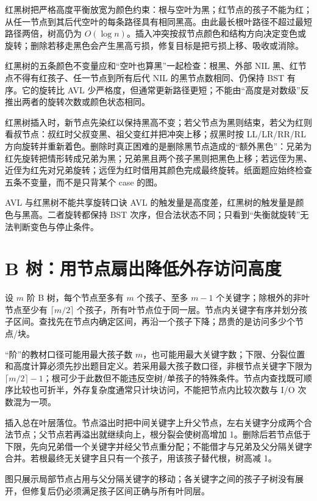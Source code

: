 \documentclass[UTF8,fontset=none,11pt,a4paper]{ctexart}
\begin{document}
红黑树把严格高度平衡放宽为颜色约束：根与空叶为黑；红节点的孩子不能为红；从任一节点到其后代空叶的每条路径具有相同黑高。由此最长根叶路径不超过最短路径两倍，树高仍为 $O(\log n)$。插入冲突按叔节点颜色和结构方向决定变色或旋转；删除若移走黑色会产生黑高亏损，修复目标是把亏损上移、吸收或消除。

红黑树的五条颜色不变量应和“空叶也算黑”一起检查：根黑、外部 NIL 黑、红节点不得有红孩子、任一节点到所有后代 NIL 的黑节点数相同、仍保持 BST 有序。它的旋转比 AVL 少严格度，但通常更新路径更短；不能由“高度是对数级”反推出两者的旋转次数或颜色状态相同。

红黑树插入时，新节点先染红以保持黑高不变；若父节点为黑则结束，若父为红则看叔节点：叔红时父叔变黑、祖父变红并把冲突上移；叔黑时按 LL/LR/RR/RL 方向旋转并重新着色。删除时真正困难的是删除黑节点造成的“额外黑色”：兄弟为红先旋转把情形转成兄弟为黑；兄弟黑且两个孩子黑则把黑色上移；若远侄为黑、近侄为红先对兄弟旋转；远侄为红时借用其颜色完成最终旋转。纸面题应始终检查五条不变量，而不是只背某个 case 的图。

\begin{warnbox}{AVL 与红黑树不能共享旋转口诀}
AVL 的触发量是高度差，红黑树的触发量是颜色与黑高。二者旋转都保持 BST 次序，但合法状态不同；只看到“失衡就旋转”无法判断变色与停止条件。
\end{warnbox}

\section{B 树：用节点扇出降低外存访问高度}
设 $m$ 阶 B 树，每个节点至多有 $m$ 个孩子、至多 $m-1$ 个关键字；除根外的非叶节点至少有 $\lceil m/2\rceil$ 个孩子，所有叶节点位于同一层。节点内关键字有序并划分孩子区间。查找先在节点内确定区间，再沿一个孩子下降；昂贵的是访问多少个节点/块。

“阶”的教材口径可能用最大孩子数 $m$，也可能用最大关键字数；下限、分裂位置和高度计算必须先抄出题目定义。若采用最大孩子数口径，非根节点关键字下限为 $\lceil m/2\rceil-1$；根可少于此数但不能违反空树/单孩子的特殊条件。节点内查找既可顺序比较也可折半，外存复杂度通常只计块访问，不能把节点内比较次数与 I/O 次数混为一项。

插入总在叶层落位。节点溢出时把中间关键字上升父节点，左右关键字分成两个合法节点；父节点若再溢出就继续向上，根分裂会使树高增加 1。删除后若节点低于下限，先向兄弟借一个关键字并经父节点重分配；不能借才与兄弟及父分隔关键字合并。若根最终无关键字且只有一个孩子，用该孩子替代根，树高减 1。

\begin{center}
\resizebox{0.94\linewidth}{!}{}
\end{center}
图只展示局部节点占用与父分隔关键字的移动；各关键字之间的孩子子树没有展开，但修复后仍必须满足孩子区间正确与所有叶同层。
\end{document}
